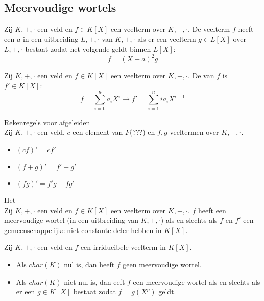 \documentclass[main.tex]{subfiles}
\begin{document}
\subsection{Meervoudige wortels}
\label{sec:meervoudige-wortels}

\begin{de}
  Zij $K,+,\cdot$ een veld en $f\in K[X]$ een veelterm over $K,+,\cdot$.
  De veelterm $f$ heeft een  $a$ in een uitbreiding $L,+,\cdot$ van $K,+,\cdot$ als er een veelterm $g\in L[X]$ over $L,+,\cdot$ bestaat zodat het volgende geldt binnen $L[X]$:
  \[ f = (X-a)^{2}g\]
\end{de}

\begin{de}
  Zij $K,+,\cdot$ een veld en $f\in K[X]$ een veelterm over $K,+,\cdot$.
  De  van $f$ is $f'\in K[X]$:
  \[ f= \sum_{i=0}^{n}a_{i}X^{i} \longrightarrow f' = \sum_{i=1}^{n}ia_{i}X^{i-1} \]
\end{de}

\begin{st}
  Rekenregels voor afgeleiden\\
  Zij $K,+,\cdot$ een veld, $c$ een element van $F$(???) en $f,g$ veeltermen over $K,+,\cdot$.
  \begin{itemize}
  \item $(cf)'= cf'$
  \item $(f+g)' = f'+g'$
  \item $(fg)' = f'g+ fg'$
  \end{itemize}
\end{st}

\begin{st}
  Het \\
  Zij $K,+,\cdot$ een veld en $f\in K[X]$ een veelterm over $K,+,\cdot$.
  $f$ heeft een meervoudige wortel (in een uitbreiding van $K,+,\cdot$) als en slechts als $f$ en $f'$ een gemeenschappelijke niet-constante deler hebben in $K[X]$.
\end{st}

\begin{st}
  Zij $K,+,\cdot$ een veld en $f$ een irriducibele veelterm in $K[X]$.
  \begin{itemize}
  \item Als $char(K)$ nul is, dan heeft $f$ geen meervoudige wortel.
  \item Als $char(K)$ niet nul is, dan eeft $f$ een meervoudige wortel als en slechts als er een $g\in K[X]$ bestaat zodat $f=g(X^{p})$ geldt.
  \end{itemize}
\end{st}
\end{document}
